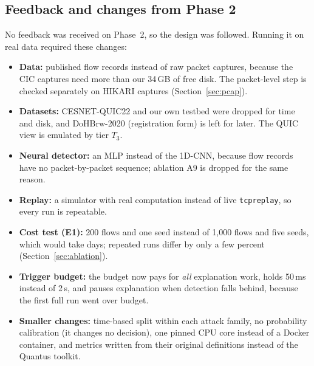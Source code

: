\subsection{Feedback and changes from Phase 2}
No feedback was received on Phase~2, so the design was followed. Running it on real data required these changes:
\begin{itemize}[leftmargin=*, itemsep=0pt]
  \item \textbf{Data:} published flow records instead of raw packet captures, because the CIC captures need more than our 34\,GB of free disk. The packet-level step is checked separately on HIKARI captures (Section~\ref{sec:pcap}).
  \item \textbf{Datasets:} CESNET-QUIC22 and our own testbed were dropped for time and disk, and DoHBrw-2020 (registration form) is left for later. The QUIC view is emulated by tier $T_3$.
  \item \textbf{Neural detector:} an MLP instead of the 1D-CNN, because flow records have no packet-by-packet sequence; ablation A9 is dropped for the same reason.
  \item \textbf{Replay:} a simulator with real computation instead of live \texttt{tcpreplay}, so every run is repeatable.
  \item \textbf{Cost test (E1):} 200 flows and one seed instead of 1{,}000 flows and five seeds, which would take days; repeated runs differ by only a few percent (Section~\ref{sec:ablation}).
  \item \textbf{Trigger budget:} the budget now pays for \emph{all} explanation work, holds 50\,ms instead of 2\,s, and pauses explanation when detection falls behind, because the first full run went over budget.
  \item \textbf{Smaller changes:} time-based split within each attack family, no probability calibration (it changes no decision), one pinned CPU core instead of a Docker container, and metrics written from their original definitions instead of the Quantus toolkit.
\end{itemize}

